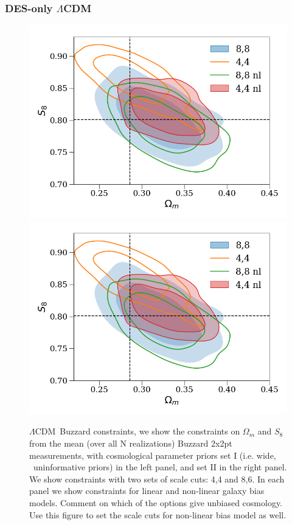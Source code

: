 \documentclass[fleqn,usenatbib]{mnras}
\newcommand{\lcdm}{$\Lambda$CDM}
\begin{document}
\subsubsection{DES-only \lcdm}

\begin{figure}
\includegraphics[width=\columnwidth]{figs/buzzard_lcdm_om-s8.png}
\includegraphics[width=\columnwidth]{figs/buzzard_lcdm_om-s8.png}
\caption[]{\lcdm\ Buzzard constraints, we show the constraints on $\Omega_m$ and $S_8$ from the mean (over all N realizations) Buzzard 2x2pt measurements, with cosmological parameter priors set I (i.e. wide, ~uninformative priors) in the left panel, and set II in the right panel. We show constraints with two sets of scale cuts: 4,4 and 8,6. In each panel we show constraints for linear and non-linear galaxy bias models. Comment on which of the options give unbiased cosmology. Use this figure to set the scale cuts for non-linear bias model as well.  }
\label{fig:bcc_des_lcdm}
\end{figure}
\end{document}
